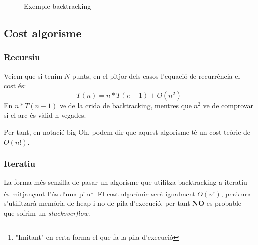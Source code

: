 \documentclass[12pt, letterpaper]{article}
\begin{document}
\begin{figure}[htbp]
\begin{center}
\caption{Exemple backtracking}
\label{exemple:backtracking}
\end{center}
\end{figure}

\subsection{Cost algorisme}

\subsubsection{Recursiu}
Veiem que si tenim $N$ punts, en el pitjor dels casos l'equació de recurrència el cost és: 
\begin{equation}
    T(n) = n*T(n-1) + O(n^2)
\end{equation}
En $n * T(n-1)$ ve de la crida de backtracking, mentres que $n^2$ ve de comprovar si el arc és vàlid n vegades.

Per tant, en notació big Oh, podem dir que aquest algorisme té un cost teòric de $O(n!)$.

\subsubsection{Iteratiu}
La forma més senzilla de pasar un algorisme que utilitza backtracking a iteratiu és mitjançant l'ús d'una pila\footnote{"Imitant" en certa forma el que fa la pila d'execució}. El cost algorímic serà igualment $O(n!)$, però ara s'utilitzarà memòria de heap i no de pila d'execució, per tant \textbf{NO} es probable que sofrim un \textit{stackoverflow}.
\end{document}
